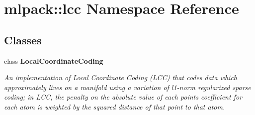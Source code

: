 \section{mlpack\+:\+:lcc Namespace Reference}
\label{namespacemlpack_1_1lcc}
\subsection*{Classes}
\begin{DoxyCompactItemize}
\item 
class \textbf{ Local\+Coordinate\+Coding}
\begin{DoxyCompactList}\small\item\em An implementation of Local Coordinate Coding (L\+CC) that codes data which approximately lives on a manifold using a variation of l1-\/norm regularized sparse coding; in L\+CC, the penalty on the absolute value of each point\textquotesingle{}s coefficient for each atom is weighted by the squared distance of that point to that atom. \end{DoxyCompactList}\end{DoxyCompactItemize}
